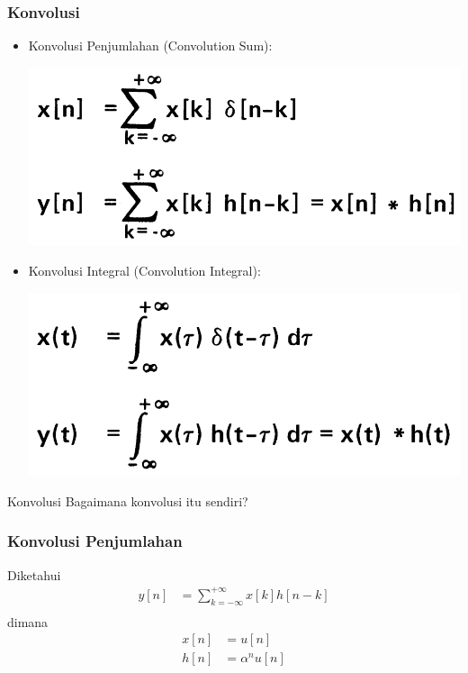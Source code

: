 \documentclass[pdflatex,compress,mathserif]{beamer}
\begin{document}
\begin{frame}
	\frametitle{Konvolusi}
	\begin{itemize}
		\item Konvolusi Penjumlahan (Convolution Sum):
		\begin{center}
			\includegraphics[width=0.6\linewidth]{img/img06}
		\end{center}
		\item Konvolusi Integral (Convolution Integral):
		\begin{center}
			\includegraphics[width=0.6\linewidth]{img/img07}
		\end{center}
	\end{itemize}
\end{frame}

\begin{frame}{Konvolusi}
	Bagaimana konvolusi itu sendiri?
\end{frame}

\begin{frame}
	\frametitle{Konvolusi Penjumlahan}
	Diketahui
	\begin{align*}
		y[n] &= \sum_{k=-\infty}^{+\infty} x[k] h[n-k] \\
	\end{align*}
	dimana
	\begin{align*}
		x[n] &= u[n] \\
		h[n] &= \alpha^n u[n]
	\end{align*}
\end{frame}
\end{document}
